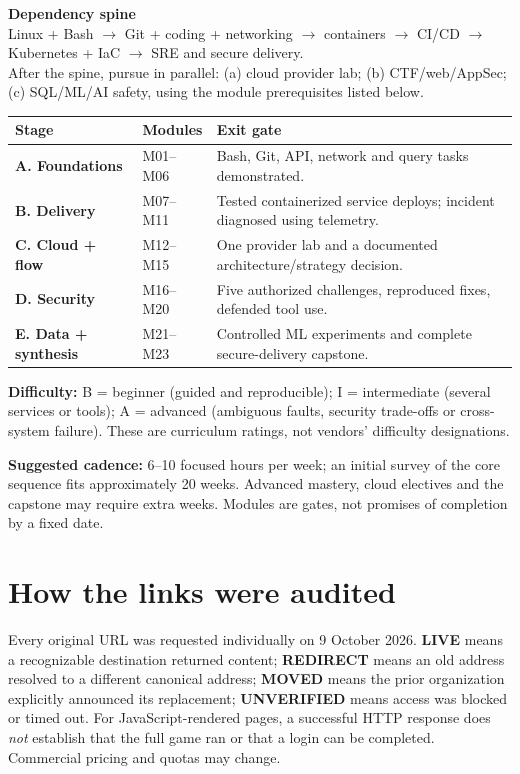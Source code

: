 \documentclass[10pt,letterpaper,oneside]{article}
\begin{document}
\begin{notebox}
\textbf{Dependency spine}\\[2pt]
\sffamily\small
Linux + Bash $\longrightarrow$ Git + coding + networking $\longrightarrow$ containers $\longrightarrow$ CI/CD $\longrightarrow$ Kubernetes + IaC $\longrightarrow$ SRE and secure delivery.\\[4pt]
After the spine, pursue in parallel: (a) cloud provider lab; (b) CTF/web/AppSec; (c) SQL/ML/AI safety, using the module prerequisites listed below.
\end{notebox}
\begin{tabularx}{\linewidth}{@{}>{\raggedright\arraybackslash}p{.2\linewidth}>{\raggedright\arraybackslash}p{.23\linewidth}>{\raggedright\arraybackslash}X@{}}
\toprule
\textbf{Stage} & \textbf{Modules} & \textbf{Exit gate}\\\midrule
\textbf{A. Foundations} & M01--M06 & Bash, Git, API, network and query tasks demonstrated.\\
\textbf{B. Delivery} & M07--M11 & Tested containerized service deploys; incident diagnosed using telemetry.\\
\textbf{C. Cloud + flow} & M12--M15 & One provider lab and a documented architecture/strategy decision.\\
\textbf{D. Security} & M16--M20 & Five authorized challenges, reproduced fixes, defended tool use.\\
\textbf{E. Data + synthesis} & M21--M23 & Controlled ML experiments and complete secure-delivery capstone.\\\bottomrule
\end{tabularx}
\textbf{Difficulty:} B = beginner (guided and reproducible); I = intermediate (several services or tools); A = advanced (ambiguous faults, security trade-offs or cross-system failure). These are curriculum ratings, not vendors' difficulty designations.

\textbf{Suggested cadence:} 6--10 focused hours per week; an initial survey of the core sequence fits approximately 20 weeks. Advanced mastery, cloud electives and the capstone may require extra weeks. Modules are gates, not promises of completion by a fixed date.
\section{How the links were audited}
Every original URL was requested individually on 9 October 2026. \textbf{LIVE} means a recognizable destination returned content; \textbf{REDIRECT} means an old address resolved to a different canonical address; \textbf{MOVED} means the prior organization explicitly announced its replacement; \textbf{UNVERIFIED} means access was blocked or timed out. For JavaScript-rendered pages, a successful HTTP response does \emph{not} establish that the full game ran or that a login can be completed. Commercial pricing and quotas may change.
\end{document}
